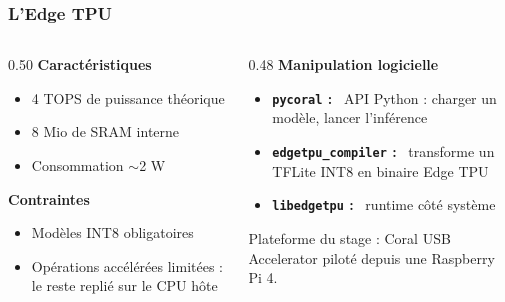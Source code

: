 \documentclass[
	11pt,
]{beamer}
\newcommand{\ititle}[1]{\textbf{#1 :}~}
\begin{document}
\begin{frame}
	\frametitle{L'Edge TPU}

	\begin{columns}[T]
	\begin{column}{0.50\textwidth}
		\footnotesize
		\vspace{0.3em}
		\textbf{Caractéristiques}
		\begin{itemize}
			\item 4 TOPS de puissance théorique
			\item 8 Mio de SRAM interne
			\item Consommation $\sim$2 W
		\end{itemize}

		\vspace{0.6em}
		\textbf{Contraintes}
		\begin{itemize}
			\item Modèles INT8 obligatoires
			\item Opérations accélérées limitées : le reste replié
			      sur le CPU hôte
		\end{itemize}
	\end{column}

	\begin{column}{0.48\textwidth}
		\footnotesize
		\vspace{0.3em}
		\textbf{Manipulation logicielle}
		\begin{itemize}
			\item \ititle{\texttt{pycoral}} API Python : charger un
			      modèle, lancer l'inférence
			\item \ititle{\texttt{edgetpu\_compiler}} transforme un
			      TFLite INT8 en binaire Edge TPU
			\item \ititle{\texttt{libedgetpu}} runtime côté système
		\end{itemize}

		\vspace{0.5em}
		{\footnotesize Plateforme du stage : Coral USB Accelerator
		piloté depuis une Raspberry Pi 4.}
	\end{column}
	\end{columns}
\end{frame}
\end{document}
